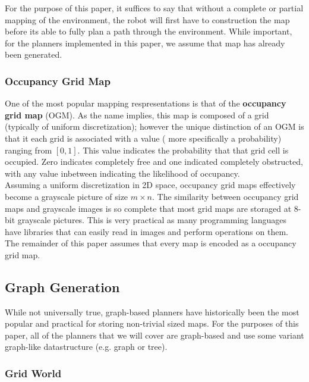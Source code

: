 \documentclass[journal]{IEEEtran}
\begin{document}
For the purpose of this paper, it suffices to say that without a complete or partial mapping of the environment, the robot will first have to construction the map before its able to fully plan a path through the environment. While important, for the planners implemented in this paper, we assume that map has already been generated.


\subsubsection{Occupancy Grid Map}

One of the most popular mapping respresentations is that of the \textbf{occupancy grid map} (OGM). As the name implies, this map is composed of a grid (typically of uniform discretization); however the unique distinction of an OGM is that it each grid is associated with a value ( more specifically a probability) ranging from $[0, 1]$. This value indicates the probability that that grid cell is occupied. Zero indicates completely free and one indicated completely obstructed, with any value inbetween indicating the likelihood of occupancy. \\

Assuming a uniform discretization in 2D space, occupancy grid maps effectively become a grayscale picture of size $m \times n$. The similarity between occupancy grid maps and grayscale images is so complete that most grid maps are storaged at 8-bit grayscale pictures. This is very practical as many programming languages have libraries that can easily read in images and perform operations on them. The remainder of this paper assumes that every map is encoded as a occupancy grid map. \\

\subsection{Graph Generation}

While not universally true, graph-based planners have historically been the most popular and practical for storing non-trivial sized maps. For the purposes of this paper, all of the planners that we will cover are graph-based and use some variant graph-like datastructure (e.g. graph or tree). \\

\subsubsection{Grid World}
\end{document}
